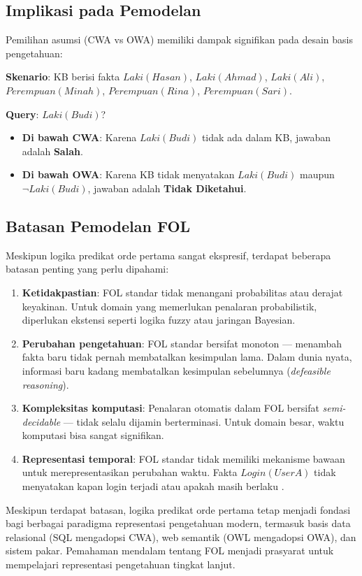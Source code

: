 \subsection{Implikasi pada Pemodelan}

Pemilihan asumsi (CWA vs OWA) memiliki dampak signifikan pada desain basis pengetahuan:

\begin{contoh}
\textbf{Skenario}: KB berisi fakta $Laki(Hasan)$, $Laki(Ahmad)$, $Laki(Ali)$, $Perempuan(Minah)$, $Perempuan(Rina)$, $Perempuan(Sari)$.

\textbf{Query}: $Laki(Budi)$?

\begin{itemize}
    \item \textbf{Di bawah CWA}: Karena $Laki(Budi)$ tidak ada dalam KB, jawaban adalah \textbf{Salah}.
    \item \textbf{Di bawah OWA}: Karena KB tidak menyatakan $Laki(Budi)$ maupun $\neg Laki(Budi)$, jawaban adalah \textbf{Tidak Diketahui}.
\end{itemize}
\end{contoh}

\subsection{Batasan Pemodelan FOL}

Meskipun logika predikat orde pertama sangat ekspresif, terdapat beberapa batasan penting yang perlu dipahami:

\begin{enumerate}
    \item \textbf{Ketidakpastian}: FOL standar tidak menangani probabilitas atau derajat keyakinan. Untuk domain yang memerlukan penalaran probabilistik, diperlukan ekstensi seperti logika fuzzy atau jaringan Bayesian.

    \item \textbf{Perubahan pengetahuan}: FOL standar bersifat monoton --- menambah fakta baru tidak pernah membatalkan kesimpulan lama. Dalam dunia nyata, informasi baru kadang membatalkan kesimpulan sebelumnya (\textit{defeasible reasoning}).

    \item \textbf{Kompleksitas komputasi}: Penalaran otomatis dalam FOL bersifat \textit{semi-decidable} --- tidak selalu dijamin berterminasi. Untuk domain besar, waktu komputasi bisa sangat signifikan.

    \item \textbf{Representasi temporal}: FOL standar tidak memiliki mekanisme bawaan untuk merepresentasikan perubahan waktu. Fakta $Login(UserA)$ tidak menyatakan kapan login terjadi atau apakah masih berlaku \cite{wiki_closed_world}.
\end{enumerate}

\begin{konsep}
Meskipun terdapat batasan, logika predikat orde pertama tetap menjadi fondasi bagi berbagai paradigma representasi pengetahuan modern, termasuk basis data relasional (SQL mengadopsi CWA), web semantik (OWL mengadopsi OWA), dan sistem pakar. Pemahaman mendalam tentang FOL menjadi prasyarat untuk mempelajari representasi pengetahuan tingkat lanjut.
\end{konsep}
